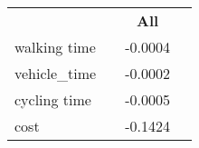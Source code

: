 {\begin{table}[h]
\begin{center}
\begin{tabular}{l|c c c}
              \cline{2-4}
                                                &                & \textbf{All}  &                  \\
              \cline{2-4}
              walking time                      &                & -0.0004       &                  \\
              vehicle\_time                     &                & -0.0002       &                  \\
              cycling time                      &                & -0.0005       &                  \\
              cost                              &                & -0.1424       &                  \\
              \hline
          \end{tabular}
      \end{center}
  \end{table}
 }


